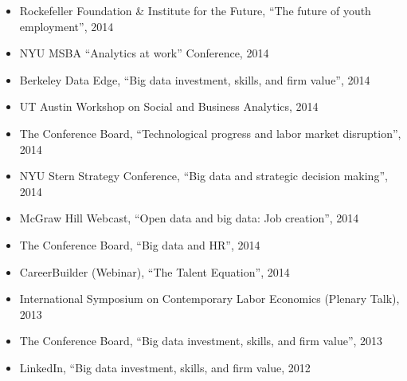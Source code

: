 \documentclass[10pt,letterpaper]{article}
\begin{document}
\begin{itemize}
\item Rockefeller Foundation \& Institute for the Future, ``The future of youth employment'', 2014
\item NYU MSBA ``Analytics at work'' Conference, 2014
\item Berkeley Data Edge, ``Big data investment, skills, and firm value'', 2014
\item UT Austin Workshop on Social and Business Analytics, 2014
\item The Conference Board, ``Technological progress and labor market disruption'', 2014
\item NYU Stern Strategy Conference, ``Big data and strategic decision making'', 2014
\item McGraw Hill Webcast, ``Open data and big data: Job creation'', 2014
\item The Conference Board, ``Big data and HR'', 2014
\item CareerBuilder (Webinar), ``The Talent Equation'', 2014
\item International Symposium on Contemporary Labor Economics (Plenary Talk), 2013
\item The Conference Board, ``Big data investment, skills, and firm value'', 2013
\item LinkedIn, ``Big data investment, skills, and firm value, 2012
\end{itemize}
\end{document}
